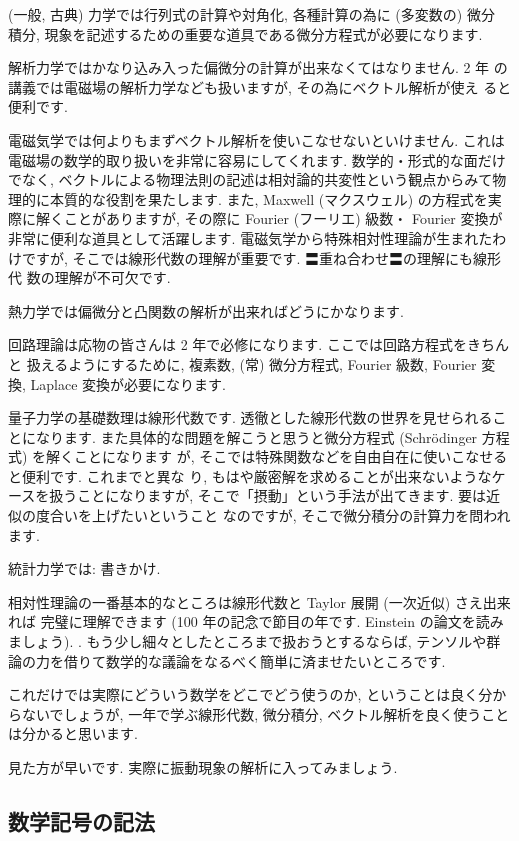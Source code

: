 \documentclass[openany, a4paper, oneside]{jsbook}
\theoremstyle{break}
\theoremstyle{breakdefn}
\begin{document}
(一般, 古典) 力学では行列式の計算や対角化, 各種計算の為に (多変数の) 微分
積分, 現象を記述するための重要な道具である微分方程式が必要になります.

解析力学ではかなり込み入った偏微分の計算が出来なくてはなりません. 2 年
の講義では電磁場の解析力学なども扱いますが, その為にベクトル解析が使え
ると便利です.

電磁気学では何よりもまずベクトル解析を使いこなせないといけません. これは
電磁場の数学的取り扱いを非常に容易にしてくれます. 数学的・形式的な面だけ
でなく, ベクトルによる物理法則の記述は相対論的共変性という観点からみて物
理的に本質的な役割を果たします. また, Maxwell (マクスウェル) の方程式を実
際に解くことがありますが, その際に Fourier (フーリエ) 級数・ Fourier 変換が
非常に便利な道具として活躍します. 電磁気学から特殊相対性理論が生まれたわ
けですが, そこでは線形代数の理解が重要です. 〓重ね合わせ〓の理解にも線形代
数の理解が不可欠です.

熱力学では偏微分と凸関数の解析が出来ればどうにかなります.

回路理論は応物の皆さんは 2 年で必修になります. ここでは回路方程式をきちんと
扱えるようにするために, 複素数, (常) 微分方程式, Fourier 級数, Fourier 変
換, Laplace 変換が必要になります.

量子力学の基礎数理は線形代数です. 透徹とした線形代数の世界を見せられることになります.
また具体的な問題を解こうと思うと微分方程式 (Schr\"odinger 方程式) を解くことになります
が, そこでは特殊関数などを自由自在に使いこなせると便利です. これまでと異な
り, もはや厳密解を求めることが出来ないようなケースを扱うことになりますが,
そこで「摂動」という手法が出てきます. 要は近似の度合いを上げたいということ
なのですが, そこで微分積分の計算力を問われます.

統計力学では: 書きかけ.

相対性理論の一番基本的なところは線形代数と Taylor 展開 (一次近似) さえ出来れば
完璧に理解できます (100 年の記念で節目の年です. Einstein の論文を読みましょう). .
もう少し細々としたところまで扱おうとするならば,
テンソルや群論の力を借りて数学的な議論をなるべく簡単に済ませたいところです.

これだけでは実際にどういう数学をどこでどう使うのか,
ということは良く分からないでしょうが, 一年で学ぶ線形代数, 微分積分, ベクトル解析を良く使うことは分かると思います.

見た方が早いです.
実際に振動現象の解析に入ってみましょう.
\subsection{数学記号の記法}
\end{document}
